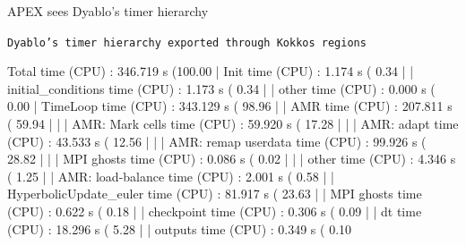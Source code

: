 \documentclass[11pt]{beamer}
\begin{document}
\begin{frame}[fragile,t]{APEX sees Dyablo's timer hierarchy}
\small
\begin{beamerboxesrounded}[upper=terminal title,lower=terminal body,width=\linewidth,shadow=false]{%
\textcolor{red!70}{\footnotesize\textbullet}\hspace{0.15em}%
\textcolor{yellow!80}{\footnotesize\textbullet}\hspace{0.15em}%
\textcolor{green!70!black}{\footnotesize\textbullet}\hspace{0.55em}%
\texttt{\scriptsize Dyablo's timer hierarchy exported through Kokkos regions}}
{\ttfamily\tiny\color{termText}
\begin{semiverbatim}
Total                           time (CPU) :   346.719 s (100.00%
| Init                          time (CPU) :     1.174 s (  0.34%
| | initial_conditions          time (CPU) :     1.173 s (  0.34%
| | other                       time (CPU) :     0.000 s (  0.00%
\textcolor{hlOrange!85!black}{| TimeLoop                      time (CPU) :   343.129 s ( 98.96%
\textcolor{hlOrange}{| | AMR                         time (CPU) :   207.811 s ( 59.94%
\textcolor{hlOrange!70!white}{| | | AMR: Mark cells           time (CPU) :    59.920 s ( 17.28%
\textcolor{hlOrange!70!white}{| | | AMR: adapt                time (CPU) :    43.533 s ( 12.56%
\textcolor{hlOrange!70!white}{| | | AMR: remap userdata       time (CPU) :    99.926 s ( 28.82%
| | | MPI ghosts                time (CPU) :     0.086 s (  0.02%
| | | other                     time (CPU) :     4.346 s (  1.25%
| | AMR: load-balance           time (CPU) :     2.001 s (  0.58%
\textcolor{hlOrange}{| | HyperbolicUpdate_euler      time (CPU) :    81.917 s ( 23.63%
| | MPI ghosts                  time (CPU) :     0.622 s (  0.18%
| | checkpoint                  time (CPU) :     0.306 s (  0.09%
\textcolor{hlOrange}{| | dt                          time (CPU) :    18.296 s (  5.28%
| | outputs                     time (CPU) :     0.349 s (  0.10%
}}}}}}}
\end{semiverbatim}}
\end{beamerboxesrounded}
\end{frame}
\end{document}
